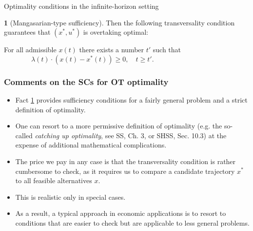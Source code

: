 \documentclass[10pt]{beamer}
\theoremstyle{definition}
\newtheorem{Fact}{\translate{Fact}}
\begin{document}
\begin{section}{Optimality conditions in the infinite-horizon setting}
\begin{frame}[fragile]
\begin{Fact}[Mangasarian-type sufficiency]
Then the following transversality condition guarantees that $ (x^*,u^*) $ is overtaking optimal:

For all admissible $ x(t) $ there exists a number $ t' $ such that \newline
${} \qquad \qquad \lambda(t)\cdot (x(t)-x^*(t))\geq 0,\quad t\geq t'. $ 
\label{fc:SCsOT}
\end{Fact}
\end{frame}

\begin{frame}[fragile]
\frametitle{Comments on the SCs for OT optimality}
\begin{itemize}\itemsep1em
\item Fact \ref{fc:SCsOT} provides sufficiency conditions for a fairly general problem and a strict definition of optimality.
\item One can resort to a more permissive definition of optimality (e.g. the so-called \emph{catching up optimality}, see SS, Ch. 3, or SHSS, Sec. 10.3) at the expense of additional mathematical complications.
\item The price we pay in any case is that the transversality condition is rather cumbersome to check, as it requires us to compare a candidate trajectory $ x^* $ to all feasible alternatives $ x $.
\item This is realistic only in special cases.
\item As a result, a typical approach in economic applications is to resort to conditions that are easier to check but are applicable to less general problems.
\end{itemize}
\end{frame}


\end{section}
\end{document}
